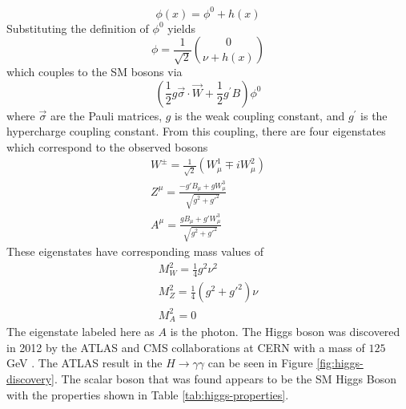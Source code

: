 		\begin{equation}\label{eqn:phi-h} \phi(x) = \phi^0 + h(x) \end{equation}
		Substituting the definition of $\phi^0$ yields
		\begin{equation}\label{eqn:phi-h-vec} \phi = \frac{1}{\sqrt{2}} \binom{0}{\nu+h(x)} \end{equation}
		which couples to the \gls{SM} bosons via
		\begin{equation}\label{eqn:coupling} (\frac{1}{2} g \vec{\sigma} \cdot \vec{W} + \frac{1}{2} g^\prime B ) \phi^0  \end{equation} where $\vec{\sigma}$ are the Pauli matrices, $g$ is the weak coupling constant, and $g^{\prime}$ is the hypercharge coupling constant. From this coupling, there are four eigenstates which correspond to the observed bosons
		\begin{equation}\label{eqn:mass-eigenstates} \begin{split}
		W^\pm = \frac{1}{\sqrt{2}} ( W^1_\mu \mp i W^2_\mu ) \\
		Z^\mu = \frac{ - g\prime B_\mu + g W^3_\mu }{ \sqrt{g^2+g\prime^2} } \\
		A^\mu = \frac{ g B_\mu + g\prime W^3_\mu }{ \sqrt{g^2+g\prime^2} }
		\end{split}
		\end{equation}
		These eigenstates have corresponding mass values of 
		\begin{equation}\label{eqn:mass-eigenstates-masses} \begin{split}
		M^2_W = \frac{1}{4}g^2\nu^2 \\
		M^2_Z = \frac{1}{4}(g^2+g\prime^2)\nu \\
		M^2_A = 0
		\end{split}
		\end{equation}
		The eigenstate labeled here as $A$ is the photon. The Higgs boson was discovered in 2012 by the \gls{ATLAS} and \gls{CMS} collaborations at \gls{CERN} with a mass of $125$ GeV \cites{higgs-discovery-atlas}{CMS-Higgs-Discovery}. The \gls{ATLAS} result in the $H \to \gamma \gamma$ can be seen in Figure \ref{fig:higgs-discovery}. The scalar boson that was found appears to be the \gls{SM} Higgs Boson with the properties shown in Table \ref{tab:higgs-properties}.

		\begin{table}[!thp]
			\centering
			\caption{The Higgs boson's properties \cite{pdg}.}
			\label{tab:higgs-properties}
		\end{table}

